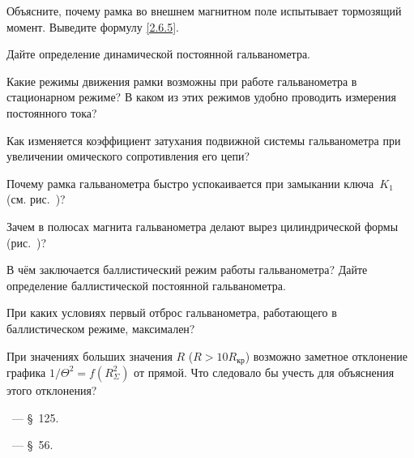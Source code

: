 \begin{lab:questions}
    \item Объясните, почему рамка во внешнем магнитном поле
    испытывает тормозящий момент. Выведите формулу \eqref{2.6.5}.
    
	\item Дайте определение динамической постоянной гальванометра. 

	\item Какие режимы движения рамки возможны при работе гальванометра в
стационарном режиме? В каком из этих режимов удобно проводить измерения
постоянного тока?

	\item Как изменяется коэффициент затухания подвижной системы гальванометра
при увеличении омического сопротивления его цепи?

	\item Почему рамка гальванометра быстро успокаивается при замыкании ключа~$K_1$ (см. рис.~)?

	\item Зачем в полюсах магнита гальванометра делают вырез цилиндрической
формы (рис.~)?

	\item В чём заключается баллистический режим работы гальванометра? Дайте
определение баллистической постоянной гальванометра.

	\item При каких условиях первый отброс гальванометра, работающего в
баллистическом режиме, максимален?

	\item При значениях больших значения $R$ ($R>10R_{\text{кр}}$)
возможно заметное отклонение графика $1/\Theta^2=f(R_{\Sigma}^2)$ от прямой. 
Что следовало бы учесть для объяснения этого отклонения?
\end{lab:questions}


\begin{lab:literature}
	\item \SivuhinIII~--- \S~125.

	\item \Kalashnikov~--- \S~56.
\end{lab:literature}
